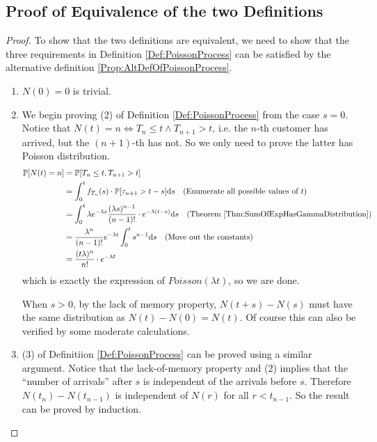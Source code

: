     \subsection{Proof of Equivalence of the two Definitions}
        \begin{proof}
            To show that the two definitions are equivalent, we need to show that the three requirements in Definition \ref{Def:PoissonProcess} can be satisfied by the alternative definition \ref{Prop:AltDefOfPoissonProcess}.
            \begin{enumerate}
                \item $N(0)=0$ is trivial.
                \item We begin proving (2) of Definition \ref{Def:PoissonProcess} from the case $s=0$. Notice that $N(t)=n \Leftrightarrow T_n \le t \wedge T_{n+1} > t$, i.e. the $n$-th customer has arrived, but the $(n+1)$-th has not. So we only need to prove the latter has Poisson distribution.
                \begin{align*}
                    \mathbb{P}[N(t)=n] &= \mathbb{P}[T_n \le t, T_{n+1} > t]\\
                    &= \int_0^tf_{T_n}(s)\cdot\mathbb{P}[\tau_{n+1} > t-s]\mathrm{d}s \quad \text{(Enumerate all possible values of $t$)}\\
                    &= \int_0^t\lambda e^{-\lambda s}\frac{(\lambda s)^{n-1}}{(n-1)!}\cdot e^{-\lambda(t-s)}\mathrm{d}s \quad \text{(Theorem \ref{Thm:SumOfExpHasGammaDistribution})}\\
                    &= \frac{\lambda^n}{(n-1)!}e^{-\lambda t}\int_0^t s^{n-1}\mathrm{d}s \quad \text{(Move out the constants)}\\
                    &= \frac{(t\lambda)^n}{n!}\cdot e^{-\lambda t}
                \end{align*}
                which is exactly the expression of $Poisson(\lambda t)$, so we are done.

                When $s > 0$, by the lack of memory property, $N(t+s)-N(s)$ must have the same distribution as $N(t) - N(0) = N(t)$. Of course this can also be verified by some moderate calculations.
                \item (3) of Definitiion \ref{Def:PoissonProcess} can be proved using a similar argument. Notice that the lack-of-memory property and (2) implies that the ``number of arrivals'' after $s$ is independent of the arrivals before $s$. Therefore $N(t_n) - N(t_{n-1})$ is independent of $N(r)$ for all $r < t_{n-1}$. So the result can be proved by induction.
            \end{enumerate}
        \end{proof}


